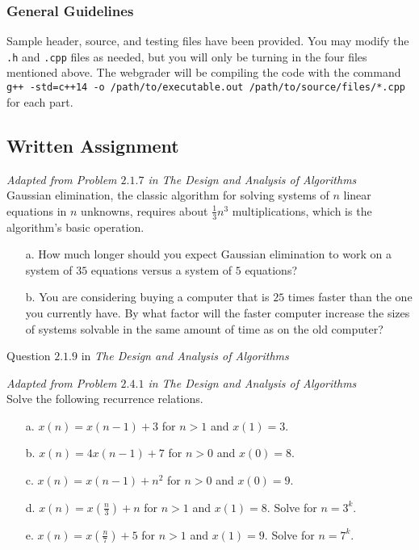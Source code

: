 \documentclass[addpoints,letter,11pt]{exam}
\begin{document}
\subsubsection*{General Guidelines}
Sample header, source, and testing files have been provided. You may modify the \verb+.h+ and \verb+.cpp+ files as needed, but you will only be turning in the four files mentioned above. The webgrader will be compiling the code with the command\\ \verb|g++ -std=c++14 -o /path/to/executable.out /path/to/source/files/*.cpp| for each part. 

\subsection*{Written Assignment}
\begin{questions}
  \question[10]
  \emph{Adapted from Problem $2.1.7$ in The Design and Analysis of Algorithms}\\
  Gaussian elimination, the classic algorithm for solving systems of $n$ linear equations in $n$ unknowns, requires about $\frac{1}{3}n^3$ multiplications, which is the algorithm's basic operation.

  \begin{enumerate}
    \item[a.] How much longer should you expect Gaussian elimination to work on a system of $35$ equations versus a system of $5$ equations?
    \item[b.] You are considering buying a computer that is $25$ times faster than the one you currently have. By what factor will the faster computer increase the sizes of systems solvable in the same amount of time as on the old computer?
  \end{enumerate}

  \question[10] 
  Question $2.1.9$ in \emph{The Design and Analysis of Algorithms}
  
  \question[10] 
  \emph{Adapted from Problem $2.4.1$ in The Design and Analysis of Algorithms}\\
  
  Solve the following recurrence relations.
  \begin{enumerate}
    \item[a.] $x\left(n\right)=x\left(n-1\right)+3$ for $n>1$ and $x\left(1\right)=3$.
    \item[b.] $x\left(n\right)=4x\left(n-1\right)+7$ for $n>0$ and $x\left(0\right)=8$.
    \item[c.] $x\left(n\right)=x\left(n-1\right)+n^2$ for $n>0$ and $x\left(0\right)=9$.
    \item[d.] $x\left(n\right)=x\left(\frac{n}{3}\right)+n$ for $n>1$ and $x\left(1\right)=8$. Solve for $n=3^{k}$.
    \item[e.] $x\left(n\right)=x\left(\frac{n}{7}\right)+5$ for $n>1$ and $x\left(1\right)=9$. Solve for $n=7^{k}$.
  \end{enumerate}
  

\end{questions}
\end{document}
